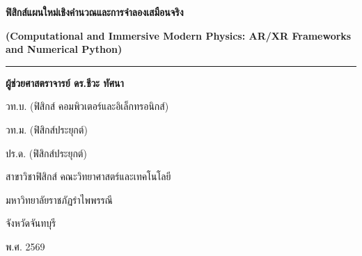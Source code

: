 \begin{titlepage}
    \centering
    \vspace*{1.5cm}
    
    {\Huge\bfseries\color{darkNavy} ฟิสิกส์แผนใหม่เชิงคำนวณและการจำลองเสมือนจริง \par}
    \vspace{0.4cm}
    {\large\bfseries\color{neonPurple} (Computational and Immersive Modern Physics: AR/XR Frameworks and Numerical Python) \par}
    
    \vspace{1.5cm}
    {\color{quantumGold}\rule{0.8\textwidth}{2pt}}
    \vspace{1.5cm}
    
    {\Large\textbf{ผู้ช่วยศาสตราจารย์ ดร.ชีวะ ทัศนา}\par}
    \vspace{0.35cm}
    {\large วท.บ. (ฟิสิกส์ คอมพิวเตอร์และอิเล็กทรอนิกส์)\par}
    \vspace{0.15cm}
    {\large วท.ม. (ฟิสิกส์ประยุกต์)\par}
    \vspace{0.15cm}
    {\large ปร.ด. (ฟิสิกส์ประยุกต์)\par}
    
    \vfill
    
    {\large สาขาวิชาฟิสิกส์ คณะวิทยาศาสตร์และเทคโนโลยี\par}
    \vspace{0.2cm}
    {\large มหาวิทยาลัยราชภัฏรำไพพรรณี\par}
    \vspace{0.2cm}
    {\large จังหวัดจันทบุรี\par}
    \vspace{0.6cm}
    {\large พ.ศ. 2569\par}
\end{titlepage}
